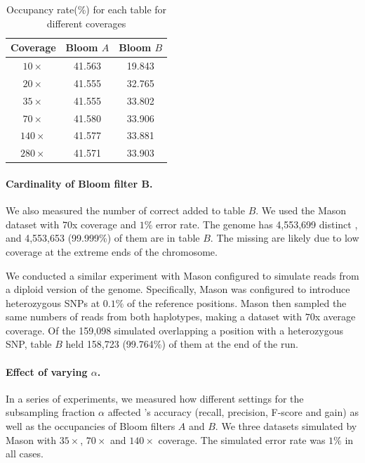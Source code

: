 \documentclass[10pt]{article}
\begin{document}
\begin{table}
\centering
\begin{tabular}{|c|c|c|}\hline
Coverage & Bloom $A$ & Bloom $B$ \\ \hline
$10\times$	& 41.563  &	19.843 \\ \hline
$20\times$	& 41.555  &	32.765 \\ \hline
$35\times$ & 41.555	& 33.802 \\ \hline
$70\times$ & 41.580	& 33.906 \\ \hline
$140\times$ & 41.577 & 33.881  \\ \hline
$280\times$ & 41.571 & 33.903 \\ \hline
\end{tabular}
\caption{Occupancy rate(\%) for each table for different coverages\label{table:bloom_occupancy_coverage}}
\end{table}

\paragraph{Cardinality of Bloom filter B.}  We also measured the number of correct \kmers added to table $B$. We used the Mason dataset with $70$x coverage and $1\%$ error rate. The \ecoli genome has 4,553,699 distinct \kmers, and 4,553,653 (99.999\%) of them are in table $B$.  The missing \kmers are likely due to low coverage at the extreme ends of the chromosome.

We conducted a similar experiment with Mason configured to simulate reads from a diploid version of the \ecoli genome.  Specifically, Mason was configured to introduce heterozygous SNPs at $0.1\%$ of the reference positions. Mason then sampled the same numbers of reads from both haplotypes, making a dataset with $70$x average coverage.
Of the 159,098 simulated \kmers overlapping a position with a heterozygous SNP, table $B$ held 158,723 (99.764\%) of them at the end of the run.

\paragraph{Effect of varying $\alpha$.} In a series of experiments, we measured how different settings for the subsampling fraction $\alpha$ affected \tool's accuracy (recall, precision, F-score and gain) as well as the occupancies of Bloom filters $A$ and $B$.  We three datasets simulated by Mason with $35\times$, $70\times$ and $140\times$ coverage.  The simulated error rate was $1\%$ in all cases.
\end{document}
